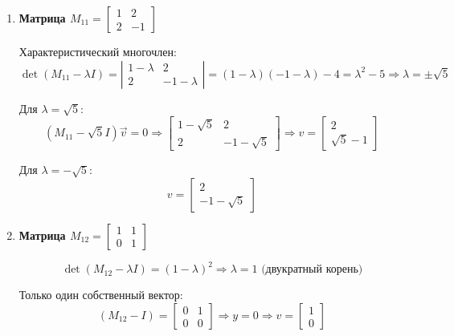 \begin{enumerate}
  Для $\lambda = 1$: $y = 0$; $v = \begin{bmatrix} 1 \\ 0 \end{bmatrix}$

  Для $\lambda = -1$: $x = 0$; $v = \begin{bmatrix} 0 \\ 1 \end{bmatrix}$

    \item \textbf{Матрица $M_{11} = 
  \begin{bmatrix}
    1 & 2 \\
    2 & -1
  \end{bmatrix}$}

  Характеристический многочлен:
  \[
    \det(M_{11} - \lambda I) = 
    \left| \begin{matrix}
      1 - \lambda & 2 \\
      2 & -1 - \lambda
    \end{matrix} \right| = (1 - \lambda)(-1 - \lambda) - 4 = \lambda^2 - 5
  \Rightarrow \lambda = \pm\sqrt{5}
  \]

  Для $\lambda = \sqrt{5}$:
  \[
    \left( M_{11} - \sqrt{5}I \right) \vec{v} = 0 \Rightarrow
    \begin{bmatrix}
      1 - \sqrt{5} & 2 \\
      2 & -1 - \sqrt{5}
    \end{bmatrix} \Rightarrow
    v = \begin{bmatrix} 2 \\ \sqrt{5} - 1 \end{bmatrix}
  \]

  Для $\lambda = -\sqrt{5}$:
  \[
    v = \begin{bmatrix} 2 \\ -1 - \sqrt{5} \end{bmatrix}
  \]

  \item \textbf{Матрица $M_{12} = 
  \begin{bmatrix}
    1 & 1 \\
    0 & 1
  \end{bmatrix}$}

  \[
    \det(M_{12} - \lambda I) = (1 - \lambda)^2 \Rightarrow \lambda = 1 \text{ (двукратный корень)}
  \]

  Только один собственный вектор:
  \[
    (M_{12} - I) = 
    \begin{bmatrix}
      0 & 1 \\
      0 & 0
    \end{bmatrix} \Rightarrow y = 0 \Rightarrow 
    v = \begin{bmatrix} 1 \\ 0 \end{bmatrix}
  \]


\end{enumerate}
